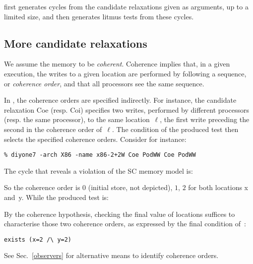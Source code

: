 \diy{} first generates cycles from the candidate relaxations
given as arguments, up to a limited size, and then generates
litmus tests from these cycles.

\subsection{More candidate relaxations}

We assume the memory to be \emph{coherent}.
Coherence implies that, in a given execution,
the writes to a given location are performed by following a sequence,
or \emph{coherence order},
and that all processors see the same sequence.


\label{sec:ws}In \diy{}, the coherence orders are specified indirectly.
For instance, the candidate relaxation Coe (resp. Coi) specifies two writes,
performed by different processors (resp. the same processor),
to the same location~$\ell$, the first write preceding the second in
the coherence order of~$\ell$.
The condition of the produced test then selects the specified coherence orders.
Consider for instance:
\begin{verbatim}
% diyone7 -arch X86 -name x86-2+2W Coe PodWW Coe PodWW
\end{verbatim}
The cycle that reveals a violation of the SC memory model is:
\begin{center}
\end{center}
So the coherence order is $0$ (initial store, not depicted),
$1$, $2$ for both locations x and~y.
While the produced test is:

By the coherence hypothesis, checking the final
value of locations suffices to characterise those two coherence orders,
as expressed by the final condition of~:
\begin{verbatim}
exists (x=2 /\ y=2)
\end{verbatim}
See Sec.~\ref{observers} for alternative means
to identify coherence orders.

